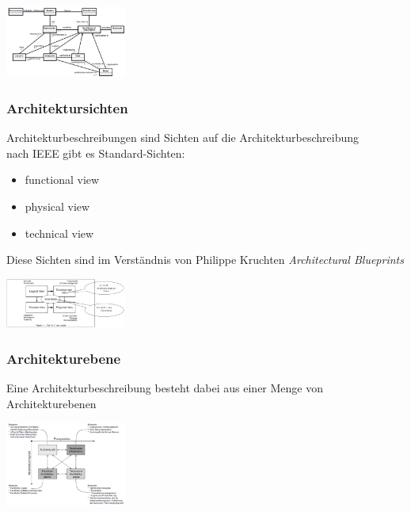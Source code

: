 \documentclass{report}
\newenvironment{Figure}
	{\par\medskip\noindent\minipage{\linewidth}}
	{\endminipage\par\medskip}
\theoremstyle{definition}
\theoremstyle{example}
\begin{document}
\begin{Figure}
   \centering
    \includegraphics[width=150px]{img/konzModelArch.png}
        \label{fig:Abbildung Kernelemente des konzeptionellen Modells gemaess IEEE-Standard 1471-2000}
\end{Figure}

\subsubsection{Architektursichten}
Architekturbeschreibungen sind Sichten auf die Architekturbeschreibung\\
nach IEEE gibt es Standard-Sichten:
\begin{itemize}
   \item functional view
   \item physical view 
   \item technical view
\end{itemize}

Diese Sichten sind im Verständnis von Philippe Kruchten \textit{Architectural Blueprints}
\begin{Figure}
   \centering
    \includegraphics[width=150px]{img/4Plus1.png}
        \label{fig:Abbildung Architectural Blueprints}
\end{Figure}

\subsubsection{Architekturebene}
Eine Architekturbeschreibung besteht dabei aus einer Menge von Architekturebenen

\begin{Figure}
   \centering
    \includegraphics[width=150px]{img/Architekturebene.png}
        \label{fig:Abbildung Architekturebene}
\end{Figure}
\end{document}
